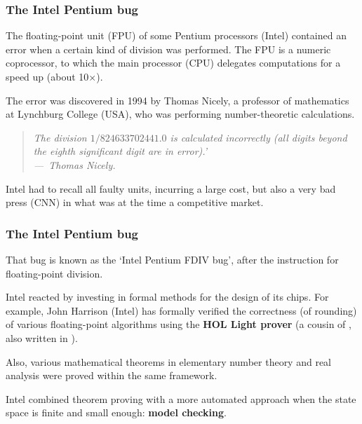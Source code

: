\documentclass[compress,dvipdfmx]{beamer}
\begin{document}
\begin{frame}
  \frametitle{The Intel Pentium bug}

  The floating-point unit (FPU) of some Pentium processors (Intel)
  contained an error when a certain kind of division was
  performed. The FPU is a numeric coprocessor, to which the main
  processor (CPU) delegates computations for a speed up (about
  10$\times$).

  \bigskip

  The error was discovered in 1994 by Thomas Nicely, a professor of
  mathematics at Lynchburg College (USA), who was performing
  number\hyp{}theoretic calculations.

  \medskip

  \begin{quote}
    \it The division \(1/824633702441.0\) is calculated incorrectly
    (all digits beyond the eighth significant digit are in error).'
    \\ \hfill ---~Thomas Nicely.
  \end{quote}
  Intel had to recall all faulty units, incurring a large cost, but
  also a very bad press (CNN) in what was at the time a competitive
  market.

\end{frame}


\begin{frame}
  \frametitle{The Intel Pentium bug}

  That bug is known as the `Intel Pentium FDIV bug', after the
  instruction for floating\hyp{}point division.

  \bigskip

  Intel reacted by investing in formal methods for the design of its
  chips. For example, John Harrison (Intel) has formally verified the
  correctness (of rounding) of various floating\hyp{}point algorithms
  using the \textbf{HOL Light prover} (a cousin of \Coq, also written
  in \OCaml).

  \bigskip

  Also, various mathematical theorems in elementary number theory and
  real analysis were proved within the same framework.

  \bigskip

  Intel combined theorem proving with a more automated approach when
  the state space is finite and small enough: \textbf{model checking}.

\end{frame}
\end{document}
